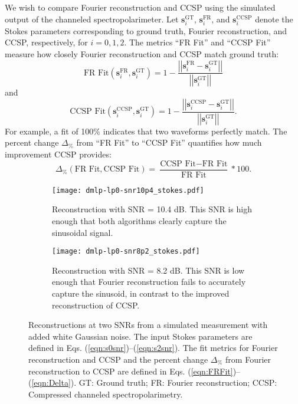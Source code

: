 \documentclass[10pt]{article}
\numberwithin{equation}{subsection}
\newcommand{\lbf}[1]{\ensuremath{{\boldsymbol #1}}}
\begin{document}
    We wish to compare Fourier reconstruction and CCSP using the simulated output of the channeled spectropolarimeter.
    Let $\lbf s_i^\text{GT}$, $\lbf s_i^\text{FR}$, and $\lbf s_i^\text{CCSP}$ denote the Stokes parameters corresponding to ground truth, Fourier reconstruction, and CCSP, respectively, for $i = 0, 1, 2$.
The metrics ``FR Fit'' and  ``CCSP Fit'' measure how closely Fourier reconstruction and CCSP match ground truth:
\begin{equation}
    \text{FR Fit}\left(\lbf s_i^\text{FR}, \lbf s_i^\text{GT}\right) = 1 - \frac{\left|\left|\lbf s_i^\text{FR} - \lbf s_i^\text{GT}\right|\right|}{\left|\left|\lbf s_i^{\text{GT}}\right|\right|}
    \label{eqn:FRFit}
\end{equation}
and
\begin{equation}
    \text{CCSP Fit}\left(\lbf s_i^\text{CCSP}, \lbf s_i^\text{GT}\right) = 1 - \frac{\left|\left|\lbf s_i^\text{CCSP} - \lbf s_i^\text{GT}\right|\right|}{\left|\left|\lbf s_i^{\text{GT}}\right|\right|}.
    \label{eqn:CSFit}
\end{equation}
For example, a fit of 100\% indicates that two waveforms perfectly match.
The percent change $\Delta_\%$ from ``FR Fit'' to ``CCSP Fit'' quantifies how much improvement CCSP provides:
\begin{equation}
    \Delta_\%(\text{FR Fit}, \text{CCSP Fit}) = \frac{\text{CCSP Fit} - \text{FR Fit}}{\text{FR Fit}} * 100.
    \label{eqn:Delta}
\end{equation}

\begin{figure}[!htb]
  \label{fig7}
  \begin{subfigure}[b]{0.5\linewidth}
    \centering
    \texttt{[image: dmlp-lp0-snr10p4\_stokes.pdf]}
    \caption{Reconstruction with SNR = 10.4 dB. This SNR is high enough that both algorithms clearly capture the sinusoidal signal.\\}
    \label{fig:snra}
  \end{subfigure}%
  \begin{subfigure}[b]{0.5\linewidth}
    \centering
    \texttt{[image: dmlp-lp0-snr8p2\_stokes.pdf]}
    \caption{Reconstruction with SNR = 8.2 dB. This SNR is low enough that Fourier reconstruction fails to accurately capture the sinusoid, in contrast to the improved reconstruction of CCSP.}
    \label{fig:snrb}
  \end{subfigure}
      \caption{Reconstructions at two SNRs from a simulated measurement with added white Gaussian noise.
      The input Stokes parameters are defined in Eqs. (\ref{eqn:s0snr})--(\ref{eqn:s2snr}).
      The fit metrics for Fourier reconstruction and CCSP and the percent change $\Delta_\%$ from Fourier reconstruction to CCSP are defined in Eqs. (\ref{eqn:FRFit})--(\ref{eqn:Delta}).
      GT: Ground truth; FR: Fourier reconstruction; CCSP: Compressed channeled spectropolarimetry.}
      \label{fig:snr}
\end{figure}
\end{document}
